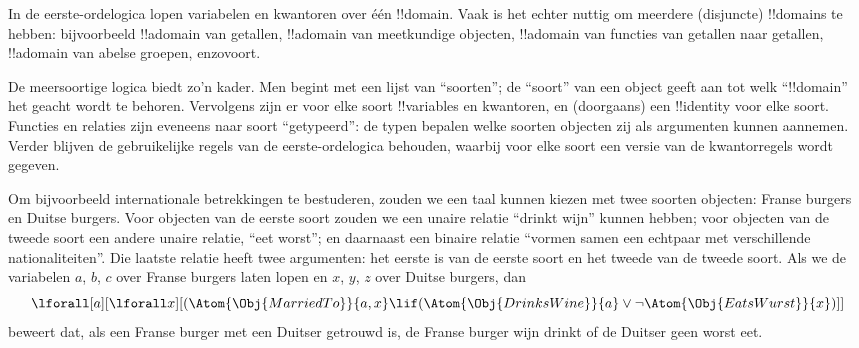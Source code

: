 \documentclass[openany]{memoir}
\begin{document}

In de eerste-ordelogica lopen variabelen en kwantoren over één
!!{domain}. Vaak is het echter nuttig om meerdere (disjuncte)
!!{domain}s te hebben: bijvoorbeeld !!a{domain} van getallen,
!!a{domain} van meetkundige objecten, !!a{domain} van functies van
getallen naar getallen, !!a{domain} van abelse groepen, enzovoort.

De meersoortige logica biedt zo'n kader. Men begint met een lijst van
``soorten''; de ``soort'' van een object geeft aan tot welk
``!!{domain}'' het geacht wordt te behoren. Vervolgens zijn er voor
elke soort !!{variable}s en kwantoren, en (doorgaans) een
!!{identity} voor elke soort. Functies en relaties zijn eveneens naar
soort ``getypeerd'': de typen bepalen welke soorten objecten zij als
argumenten kunnen aannemen. Verder blijven de gebruikelijke regels
van de eerste-ordelogica behouden, waarbij voor elke soort een versie
van de kwantorregels wordt gegeven.

Om bijvoorbeeld internationale betrekkingen te bestuderen, zouden we
een taal kunnen kiezen met twee soorten objecten: Franse burgers en
Duitse burgers. Voor objecten van de eerste soort zouden we een unaire
relatie ``drinkt wijn'' kunnen hebben; voor objecten van de tweede
soort een andere unaire relatie, ``eet worst''; en daarnaast een
binaire relatie ``vormen samen een echtpaar met verschillende
nationaliteiten''. Die laatste relatie heeft twee argumenten: het
eerste is van de eerste soort en het tweede van de tweede soort. Als
we de variabelen $a$, $b$, $c$ over Franse burgers laten lopen en $x$, $y$, $z$
over Duitse burgers, dan
\[
\lforall[a][\lforall x][(\Atom{\Obj{MarriedTo}}{a,x} \lif
(\Atom{\Obj{DrinksWine}}{a} \lor \lnot \Atom{\Obj{EatsWurst}}{x})]]
\]
beweert dat, als een Franse burger met een Duitser getrouwd is, de
Franse burger wijn drinkt of de Duitser geen worst eet.
\end{document}
